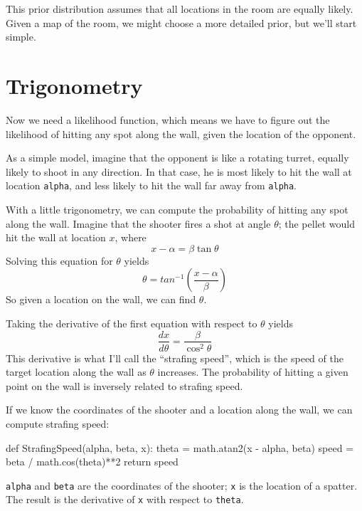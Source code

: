 \documentclass[12pt]{book}
\theoremstyle{exercise}
\begin{document}
This prior distribution assumes that all locations in the room are
equally likely.  Given a map of the room, we might choose a more
detailed prior, but we'll start simple.


\section{Trigonometry}

Now we need a likelihood function, which means we have to figure
out the likelihood of hitting any spot along the wall, given
the location of the opponent.

As a simple model, imagine that the opponent is like a rotating
turret, equally likely to shoot in any direction.
In that case, he is most likely to hit
the wall at location {\tt alpha}, and less likely to hit the wall far
away from {\tt alpha}.

With a little trigonometry, we can compute the probability of hitting
any spot along the wall.  Imagine that the shooter fires a shot at
angle $\theta$; the pellet would hit the wall at location $x$, where
%
\[ x - \alpha = \beta \tan \theta \]
%
Solving this equation for $\theta$ yields
%
\[ \theta = tan^{-1} \left( \frac{x - \alpha}{\beta} \right) \]
%
So given a location on the wall, we can find $\theta$.

Taking the derivative of the first equation with respect to
$\theta$ yields
%
\[ \frac{dx}{d\theta} = \frac{\beta}{\cos^2 \theta} \]
%
This derivative is what I'll call the ``strafing speed'',
which is the speed of the target location along the wall as $\theta$
increases.  The probability of hitting a given point on the wall is
inversely related to strafing speed.

If we know the coordinates of the shooter and a location 
along the wall, we can compute strafing speed:

\begin{code}
def StrafingSpeed(alpha, beta, x):
    theta = math.atan2(x - alpha, beta)
    speed = beta / math.cos(theta)**2
    return speed
\end{code}

{\tt alpha} and {\tt beta} are the coordinates of the shooter;
{\tt x} is the location of a spatter.  The result is
the derivative of {\tt x} with respect to {\tt theta}.
\end{document}
